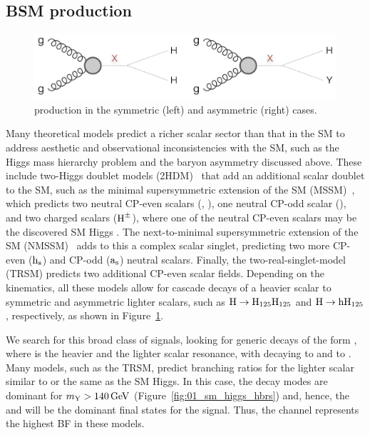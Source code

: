 \subsection{BSM \texorpdfstring{\XHY}{X→HY} production}
\label{sec:05_bsmxhy}

\begin{figure}[htb] %
    \centering
    \includegraphics[width=\textwidth]{figures/05-HH/production/xhy.png}
    \caption{\XHY production in the symmetric (left) and asymmetric (right) cases.}
    \label{fig:05_xhy_production}
\end{figure} 

Many theoretical models predict a richer scalar sector than that in the SM to address aesthetic and observational inconsistencies with the SM, such as the Higgs mass hierarchy problem and the baryon asymmetry discussed above.
These include two-Higgs doublet models (2HDM)~\cite{Branco:2011iw} that add an additional scalar doublet to the SM, such as the minimal supersymmetric extension of the SM (MSSM)~\cite{Craig:2013hca}, which predicts two neutral CP-even scalars (\PH, \Ph), one neutral CP-odd scalar (\PA), and two charged scalars ($\textrm{H}^\pm$), where one of the neutral CP-even scalars may be the discovered SM Higgs \PHsm.
The next-to-minimal supersymmetric extension of the SM (NMSSM)~\cite{Domingo:2022kfm} adds to this a complex scalar singlet, predicting two more CP-even ($\textrm{h}_\mathrm{s}$) and CP-odd ($\textrm{a}_\mathrm{s}$) neutral scalars.
Finally, the two-real-singlet-model (TRSM) predicts two additional CP-even scalar fields.
Depending on the kinematics, all these models allow for cascade decays of a heavier scalar to symmetric and asymmetric lighter scalars, such as $\textrm{H}\to\textrm{H}_{125}\textrm{H}_{125}$ and $\textrm{H}\to\textrm{h}\textrm{H}_{125}$, respectively, as shown in Figure~\ref{fig:05_xhy_production}.

We search for this broad class of signals, looking for generic decays of the form \XHY, where \PX is the heavier and \PY the lighter scalar resonance, with \PH decaying to \bbbar and \PY to \VVq. 
Many models, such as the TRSM, predict branching ratios for the lighter scalar similar to or the same as the SM Higgs.
In this case, the \VV decay modes are dominant for ${m_\textrm{Y}} > 140\,\text{Ge\hspace{-.08em}V}$ (Figure~\ref{fig:01_sm_higgs_hbrs}) and, hence, the \hbb and \yvv will be the dominant final states for the \XHY signal.
Thus, the \bbvv channel represents the highest BF in these models.


